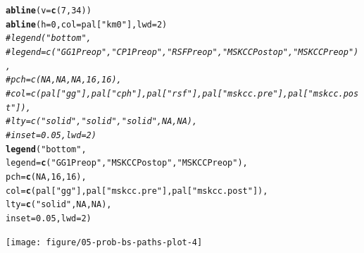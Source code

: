 \documentclass{article}\usepackage[]{graphicx}\usepackage[]{color}
\makeatletter
\newcommand{\hlnum}[1]{\textcolor[rgb]{0.686,0.059,0.569}{#1}}%
\newcommand{\hlstr}[1]{\textcolor[rgb]{0.192,0.494,0.8}{#1}}%
\newcommand{\hlcom}[1]{\textcolor[rgb]{0.678,0.584,0.686}{\textit{#1}}}%
\newcommand{\hlstd}[1]{\textcolor[rgb]{0.345,0.345,0.345}{#1}}%
\newcommand{\hlkwc}[1]{\textcolor[rgb]{0.333,0.667,0.333}{#1}}%
\newcommand{\hlkwd}[1]{\textcolor[rgb]{0.737,0.353,0.396}{\textbf{#1}}}%
\newenvironment{kframe}{%
 \def\at@end@of@kframe{}%
 \ifinner\ifhmode%
  \def\at@end@of@kframe{\end{minipage}}%
  \begin{minipage}{\columnwidth}%
 \fi\fi%
 \def\FrameCommand##1{\hskip\@totalleftmargin \hskip-\fboxsep
 \colorbox{shadecolor}{##1}\hskip-\fboxsep
     \hskip-\linewidth \hskip-\@totalleftmargin \hskip\columnwidth}%
 \MakeFramed {\advance\hsize-\width
   \@totalleftmargin\z@ \linewidth\hsize
   \@setminipage}}%
 {\par\unskip\endMakeFramed%
 \at@end@of@kframe}
\newenvironment{knitrout}{}{} %
\makeatother
\begin{document}
\begin{knitrout}
\begin{kframe}
\begin{alltt}
\hlkwd{abline}\hlstd{(}\hlkwc{v} \hlstd{=} \hlkwd{c}\hlstd{(}\hlnum{7}\hlstd{,} \hlnum{34}\hlstd{))}
\hlkwd{abline}\hlstd{(}\hlkwc{h} \hlstd{=} \hlnum{0}\hlstd{,} \hlkwc{col} \hlstd{= pal[}\hlstr{"km0"}\hlstd{],} \hlkwc{lwd} \hlstd{=} \hlnum{2}\hlstd{)}
\hlcom{# legend("bottom", }
\hlcom{# 	legend = c(	"GG1 Preop", 	"CP1 Preop", 	"RSF Preop", 	"MSKCC Postop", 	"MSKCC Preop"), }
\hlcom{# 	pch = c(	NA, 			NA, 			NA, 			16, 				16), }
\hlcom{# 	col = c(	pal["gg"], 		pal["cph"], 	pal["rsf"], 	pal["mskcc.pre"], 	pal["mskcc.post"]), }
\hlcom{# 	lty = c(	"solid", 		"solid", 		"solid", 		NA, 				NA), }
\hlcom{# 	inset = 0.05, lwd = 2)}
\hlkwd{legend}\hlstd{(}\hlstr{"bottom"}\hlstd{,}
        \hlkwc{legend} \hlstd{=} \hlkwd{c}\hlstd{(}     \hlstr{"GG1 Preop"}\hlstd{,}    \hlstr{"MSKCC Postop"}\hlstd{,}         \hlstr{"MSKCC Preop"}\hlstd{),}
        \hlkwc{pch} \hlstd{=} \hlkwd{c}\hlstd{(}        \hlnum{NA}\hlstd{,}                     \hlnum{16}\hlstd{,}                             \hlnum{16}\hlstd{),}
        \hlkwc{col} \hlstd{=} \hlkwd{c}\hlstd{(        pal[}\hlstr{"gg"}\hlstd{],              pal[}\hlstr{"mskcc.pre"}\hlstd{],       pal[}\hlstr{"mskcc.post"}\hlstd{]),}
        \hlkwc{lty} \hlstd{=} \hlkwd{c}\hlstd{(}        \hlstr{"solid"}\hlstd{,}                \hlnum{NA}\hlstd{,}                             \hlnum{NA}\hlstd{),}
        \hlkwc{inset} \hlstd{=} \hlnum{0.05}\hlstd{,} \hlkwc{lwd} \hlstd{=} \hlnum{2}\hlstd{)}
\end{alltt}
\end{kframe}

{\centering \texttt{[image: figure/05-prob-bs-paths-plot-4]} 

}



\end{knitrout}
\end{document}
